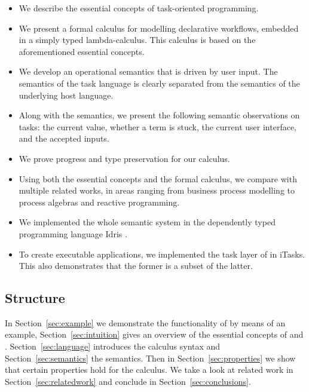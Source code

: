 \begin{itemize}
  \item
    We describe the essential concepts of task-oriented programming.

  \item
    We present a formal calculus for modelling declarative workflows, embedded in a simply typed lambda-calculus.
    This calculus is based on the aforementioned essential \TOP concepts.

  \item
    We develop an operational semantics that is driven by user input.
    The semantics of the task language is clearly separated from the semantics of the underlying host language.

  \item
    Along with the semantics, we present the following semantic observations on tasks:
    the current value, whether a term is stuck, the current user interface, and the accepted inputs. 

  \item
    We prove progress and type preservation for our calculus.

  \item
    Using both the essential concepts and the formal calculus, we compare \TOP with multiple related works, in areas ranging from business process modelling to process algebras and reactive programming.

  \item
    We implemented the whole semantic system in the dependently typed programming language Idris \cite{journals/jfp/Brady13}.

  \item

    To create executable applications, we implemented the task layer of \TOPHAT in iTasks.
    This also demonstrates that the former is a subset of the latter.


\end{itemize}


\subsection{Structure}

In Section~\ref{sec:example} we demonstrate the functionality of \TOPHAT by means of an example,
Section~\ref{sec:intuition} gives an overview of the essential concepts of \TOP and \TOPHAT.
Section~\ref{sec:language} introduces the \TOPHAT calculus syntax
and Section~\ref{sec:semantics} the semantics.
Then in Section~\ref{sec:properties} we show that certain properties hold for the calculus.
We take a look at related work in Section~\ref{sec:relatedwork}
and conclude in Section~\ref{sec:conclusions}.
